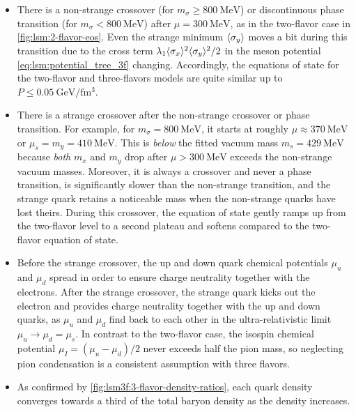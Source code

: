 \begin{itemize}
\item There is a non-strange crossover (for $m_\sigma \geq \SI{800}{\mega\electronvolt}$)
      or discontinuous phase transition (for $m_\sigma < \SI{800}{\mega\electronvolt}$)
      after $\mu=\SI{300}{\mega\electronvolt}$, as in the two-flavor case in \cref{fig:lsm:2-flavor-eos}.
      Even the strange minimum $\langle \sigma_y \rangle$ moves a bit during this transition
      due to the cross term $\lambda_1 \langle \sigma_x \rangle^2 \langle \sigma_y \rangle^2 / 2$ in the meson potential \eqref{eq:lsm:potential_tree_3f} changing.
      Accordingly, the equations of state for the two-flavor and three-flavors models are quite similar up to $P \leq \SI{0.05}{\giga\electronvolt\per\femto\meter\cubed}$.
\item There is a strange crossover after the non-strange crossover or phase transition.
      For example, for $m_\sigma=\SI{800}{\mega\electronvolt}$, it starts at roughly $\mu \approx \SI{370}{\mega\electronvolt}$ 
      or $\mu_s = m_y = \SI{410}{\mega\electronvolt}$.
      This is \emph{below} the fitted vacuum mass $m_s=\SI{429}{\mega\electronvolt}$
      because \emph{both} $m_x$ and $m_y$ drop after $\mu > \SI{300}{\mega\electronvolt}$ exceeds the non-strange vacuum masses.
      Moreover, it is always a crossover and never a phase transition,
      is significantly slower than the non-strange transition,
      and the strange quark retains a noticeable mass when the non-strange quarks have lost theirs.
      During this crossover, the equation of state gently ramps up from the two-flavor level to a second plateau
      and softens compared to the two-flavor equation of state.
\item Before the strange crossover, the up and down quark chemical potentials $\mu_u$ and $\mu_d$
      spread in order to ensure charge neutrality together with the electrons.
      After the strange crossover, the strange quark kicks out the electron
      and provides charge neutrality together with the up and down quarks,
      as $\mu_u$ and $\mu_d$ find back to each other in the ultra-relativistic limit $\mu_u \rightarrow \mu_d = \mu_s$.
      In contrast to the two-flavor case,
      the isospin chemical potential $\mu_I=(\mu_u-\mu_d)/2$ never exceeds half the pion mass,
      so neglecting pion condensation is a consistent assumption with three flavors.
\item As confirmed by \cref{fig:lsm3f:3-flavor-density-ratios}, each quark density converges towards a third of the total baryon density as the density increases.

\end{itemize}
